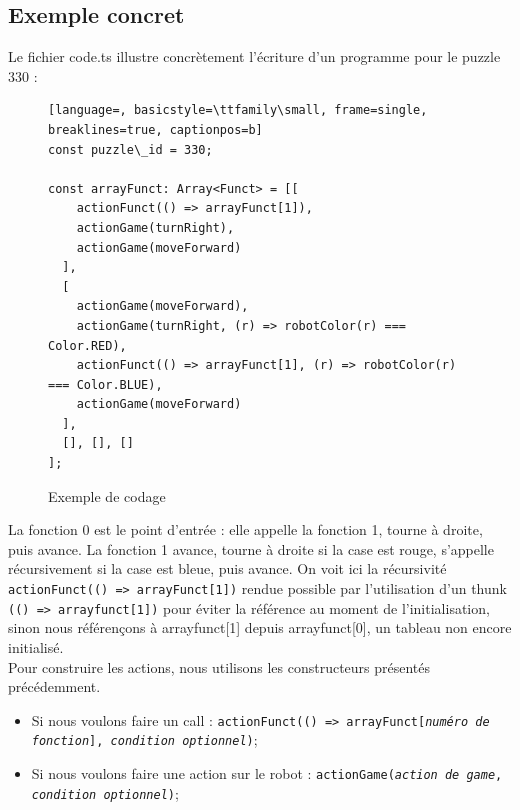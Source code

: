 \subsection{Exemple concret}

Le fichier code.ts illustre concrètement l'écriture d'un programme pour le puzzle 330 :

\begin{figure}[H]
\centering
\begin{lstlisting}[language=, basicstyle=\ttfamily\small, frame=single, breaklines=true, captionpos=b]
const puzzle\_id = 330;

const arrayFunct: Array<Funct> = [[
    actionFunct(() => arrayFunct[1]),
    actionGame(turnRight),
    actionGame(moveForward)
  ],
  [
    actionGame(moveForward),
    actionGame(turnRight, (r) => robotColor(r) === Color.RED),
    actionFunct(() => arrayFunct[1], (r) => robotColor(r) === Color.BLUE),
    actionGame(moveForward)
  ],
  [], [], []
];
\end{lstlisting}
\caption{Exemple de codage}
\label{code:code}
\end{figure}

La fonction 0 est le point d'entrée : elle appelle la fonction 1, tourne à droite, puis avance. La fonction 1 avance, tourne à droite si la case est rouge, s'appelle récursivement si la case est bleue, puis avance. On voit ici la récursivité \texttt{actionFunct(() => arrayFunct[1])} rendue possible par l'utilisation d'un thunk \texttt{(() => arrayfunct[1])} pour éviter la référence au moment de l'initialisation, sinon nous référençons à arrayfunct[1] depuis arrayfunct[0], un tableau non encore initialisé. 
\\

Pour construire les actions, nous utilisons les constructeurs présentés précédemment. 
\begin{itemize}
  \item Si nous voulons faire un call :  \texttt{actionFunct(() => arrayFunct[\textit{numéro de fonction}], \textit{condition optionnel})};
  \item Si nous voulons faire une action sur le robot : \texttt{actionGame(\textit{action de game}, \textit{condition optionnel})};
\end{itemize}


